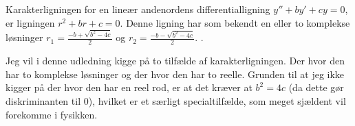 \begin{definition}[Karakterligningen]
Karakterligningen for en lineær andenordens differentialligning $y'' + by' + cy = 0$, er ligningen $r^2 + br + c = 0$. 
Denne ligning har som bekendt en eller to komplekse løsninger $r_1 = \frac{-b + \sqrt{b^2 - 4c}}{2}$ og $r_2 = \frac{-b - \sqrt{b^2 - 4c}}{2}$. .
\end{definition}

Jeg vil i denne udledning kigge på to tilfælde af karakterligningen. 
Der hvor den har to komplekse løsninger og der hvor den har to reelle.
Grunden til at jeg ikke kigger på der hvor den har en reel rod, er at det kræver at $b^2 = 4c$ (da dette gør diskriminanten til $0$), hvilket er et særligt specialtilfælde, som meget sjældent vil forekomme i fysikken.

